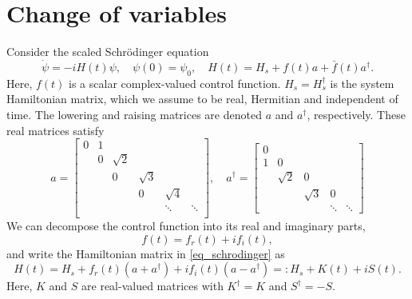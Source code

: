 \documentclass[11pt]{article}
\begin{document}



\section{Change of variables}
Consider the scaled Schr\"odinger equation
\begin{equation}\label{eq_schrodinger}
\dot{\psi} = -i H(t) \psi,\quad \psi(0) = \psi_0,\quad H(t) = H_s + f(t)a + \bar{f}(t)a^\dag.
\end{equation}
Here, $f(t)$ is a scalar complex-valued control function. $H_s = H_s^\dag$ is the system Hamiltonian matrix, which we assume to be real, Hermitian and
independent of time. The lowering and raising matrices are denoted $a$ and $a^\dag$,
respectively. These real matrices satisfy
\begin{equation}\label{eq_matrices}
%
a = \begin{bmatrix}
0 & 1 & & & &\\
 & 0 & \sqrt{2} & & &\\
&  & 0 & \sqrt{3} & &\\
& &  & 0 & \sqrt{4} & \\
& &  &  & \ddots & \ddots\\
\end{bmatrix},\quad
%
a^\dag = \begin{bmatrix}
0 &  & & &\\
1 & 0 & & &\\
&  \sqrt{2} & 0 &  &\\
& &  \sqrt{3} & 0 & \\
& &  & \ddots & \ddots
\end{bmatrix}
\end{equation}
We can decompose the control function into its real and imaginary parts,
\[
f(t) = f_r(t) + i f_i(t),
\]
and write the Hamiltonian matrix in \eqref{eq_schrodinger} as
\[
H(t) = H_s + f_r(t)\left( a+ a^\dag\right) + i f_i(t)\left( a - a^\dag\right) =: H_s + K(t) + i S(t).
\]
Here, $K$ and $S$ are real-valued matrices with $K^\dag = K$ and $S^\dag = -S$.
\end{document}
